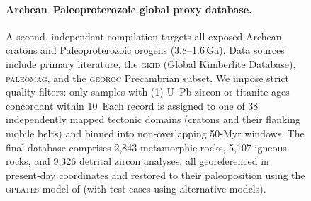 \documentclass{article}
\begin{document}
\begin{figure}[t]
{\paragraph{Archean–Paleoproterozoic global proxy database.}
A second, independent compilation targets all exposed Archean cratons and Paleoproterozoic orogens (3.8–1.6 Ga).
Data sources include primary literature, the \textsc{gkid} (Global Kimberlite Database), \textsc{paleomag}, and the \textsc{georoc} Precambrian subset.
We impose strict quality filters: only samples with (1) U–Pb zircon or titanite ages concordant within 10 %
Each record is assigned to one of 38 independently mapped tectonic domains (cratons and their flanking mobile belts) and binned into non‑overlapping 50‑Myr windows.
The final database comprises 2,843 metamorphic rocks, 5,107 igneous rocks, and 9,326 detrital zircon analyses, all georeferenced in present‑day coordinates and restored to their paleoposition using the \textsc{gplates} model of \cite{merdith21} (with test cases using alternative models).

}
\end{figure}
\end{document}
